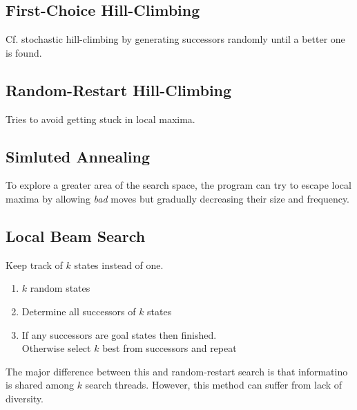 \documentclass{article}
\begin{document}
\subsection{First-Choice Hill-Climbing}
Cf. stochastic hill-climbing by generating successors randomly until a better one is found.

\subsection{Random-Restart Hill-Climbing}
Tries to avoid getting stuck in local maxima.

\subsection{Simluted Annealing}
To explore a greater area of the search space, the program can try to escape local maxima by allowing \textit{bad} moves but gradually decreasing their size and frequency.

\subsection{Local Beam Search}
Keep track of $k$ states instead of one.
\begin{enumerate}
	\item $k$ random states
	\item Determine all successors of $k$ states
	\item If any successors are goal states then finished. \\
	Otherwise select $k$ best from successors and repeat
\end{enumerate}
The major difference between this and random-restart search is that informatino is shared among $k$ search threads.
However, this method can suffer from lack of diversity.
\end{document}
